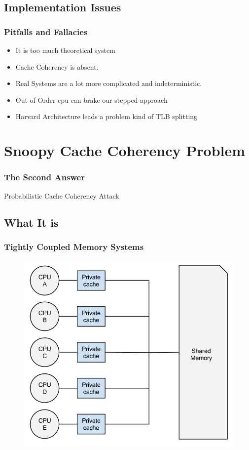 \documentclass{beamer}
\begin{document}
\subsection{Implementation Issues}
\begin{frame}
	\frametitle{Pitfalls and Fallacies}
	\begin{itemize}
		\item It is too much theoretical system
		\item Cache Coherency is absent.
		\item Real Systems are a lot more complicated and indeterministic.
		\item Out-of-Order cpu can brake our stepped approach
		\item Harvard Architecture leads a problem kind of TLB splitting
	\end{itemize}
\end{frame}







\section{Snoopy Cache Coherency Problem}
\begin{frame}
	\frametitle{The Second Answer}
	\huge{\centerline{Probabilistic Cache Coherency Attack}}
\end{frame}

\subsection{What It is}
\begin{frame}
	\frametitle{Tightly Coupled Memory Systems}
		\begin{figure}
			\includegraphics[width=0.6\linewidth]{img/tightly_coupled_memories.png}
		\end{figure}
\end{frame}
\end{document}
